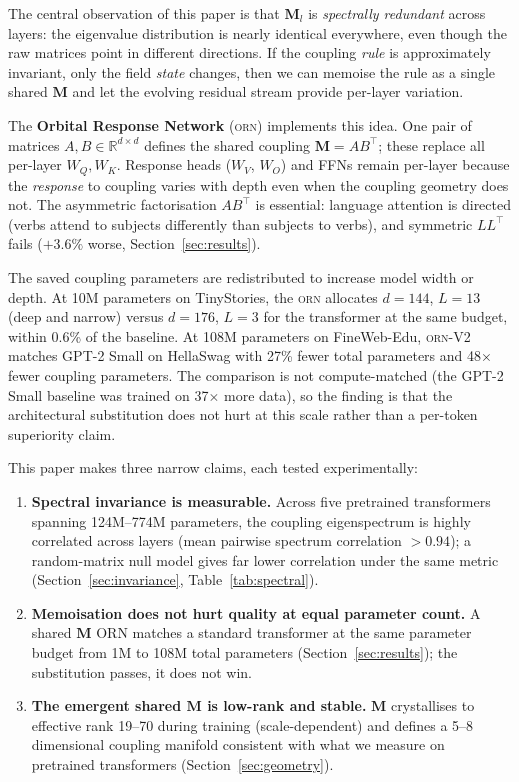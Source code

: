 \documentclass[10pt,twocolumn]{article}
\newcommand{\M}{\mathbf{M}}
\newcommand{\R}{\mathbb{R}}
\newcommand{\orn}{\textsc{orn}}
\begin{document}
The central observation of this paper is that $\M_l$ is \emph{spectrally redundant} across layers: the eigenvalue distribution is nearly identical everywhere, even though the raw matrices point in different directions.
If the coupling \emph{rule} is approximately invariant, only the field \emph{state} changes, then we can memoise the rule as a single shared $\M$ and let the evolving residual stream provide per-layer variation.

The \textbf{Orbital Response Network} (\orn{}) implements this idea.
One pair of matrices $A, B \in \R^{d \times d}$ defines the shared coupling $\M = AB^\top$; these replace all per-layer $W_Q, W_K$.
Response heads ($W_V$, $W_O$) and FFNs remain per-layer because the \emph{response} to coupling varies with depth even when the coupling geometry does not.
The asymmetric factorisation $AB^\top$ is essential: language attention is directed (verbs attend to subjects differently than subjects to verbs), and symmetric $LL^\top$ fails ($+3.6\%$ worse, Section~\ref{sec:results}).

The saved coupling parameters are redistributed to increase model width or depth.
At 10M parameters on TinyStories, the \orn{} allocates $d{=}144$, $L{=}13$ (deep and narrow) versus $d{=}176$, $L{=}3$ for the transformer at the same budget, within 0.6\% of the baseline.
At 108M parameters on FineWeb-Edu, \orn{}-V2 matches GPT-2 Small on HellaSwag with 27\% fewer total parameters and 48$\times$ fewer coupling parameters. The comparison is not compute-matched (the GPT-2 Small baseline was trained on 37$\times$ more data), so the finding is that the architectural substitution does not hurt at this scale rather than a per-token superiority claim.

This paper makes three narrow claims, each tested experimentally:
\begin{enumerate}[nosep,leftmargin=1.5em]
\item \textbf{Spectral invariance is measurable.} Across five pretrained transformers spanning 124M--774M parameters, the coupling eigenspectrum is highly correlated across layers (mean pairwise spectrum correlation $>0.94$); a random-matrix null model gives far lower correlation under the same metric (Section~\ref{sec:invariance}, Table~\ref{tab:spectral}).
\item \textbf{Memoisation does not hurt quality at equal parameter count.} A shared $\M$ ORN matches a standard transformer at the same parameter budget from 1M to 108M total parameters (Section~\ref{sec:results}); the substitution passes, it does not win.
\item \textbf{The emergent shared $\M$ is low-rank and stable.} $\M$ crystallises to effective rank 19--70 during training (scale-dependent) and defines a 5--8 dimensional coupling manifold consistent with what we measure on pretrained transformers (Section~\ref{sec:geometry}).
\end{enumerate}
\end{document}
